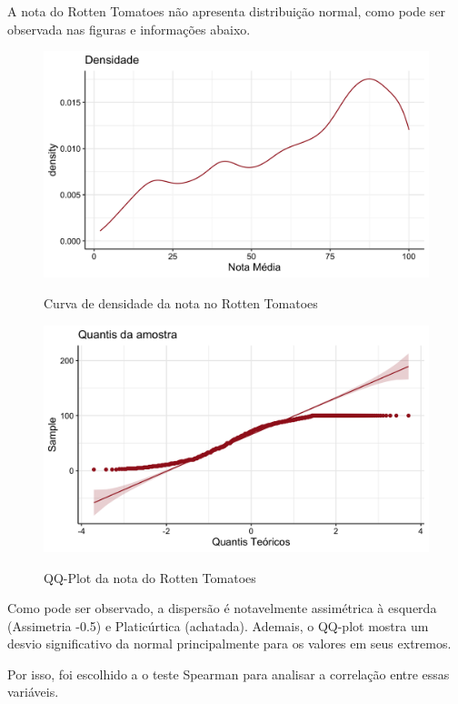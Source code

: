 \documentclass[a4paper, 12pt]{article} %
\begin{document}
A nota do Rotten Tomatoes não apresenta distribuição normal, como pode ser observada nas figuras e informações abaixo.

\begin{figure}[H]
    \centering
    \caption{Curva de densidade da nota no Rotten Tomatoes }
    \includegraphics[scale=0.15]{Fig_Rotten_Densidade.png}
    \label{fig:my_label}
\end{figure}

\begin{figure}[H]
    \centering
    \caption{QQ-Plot da nota do Rotten Tomatoes}
    \includegraphics[scale=0.15]{Fig_Rotten_QQ.png}
    \label{fig:my_label}
\end{figure}

Como pode ser observado, a dispersão é notavelmente assimétrica à esquerda (Assimetria -0.5) e Platicúrtica (achatada). Ademais, o QQ-plot mostra um desvio significativo da normal principalmente para os valores em seus extremos. 

Por isso, foi escolhido a o teste Spearman para analisar a correlação entre essas variáveis.
 
\end{document}
